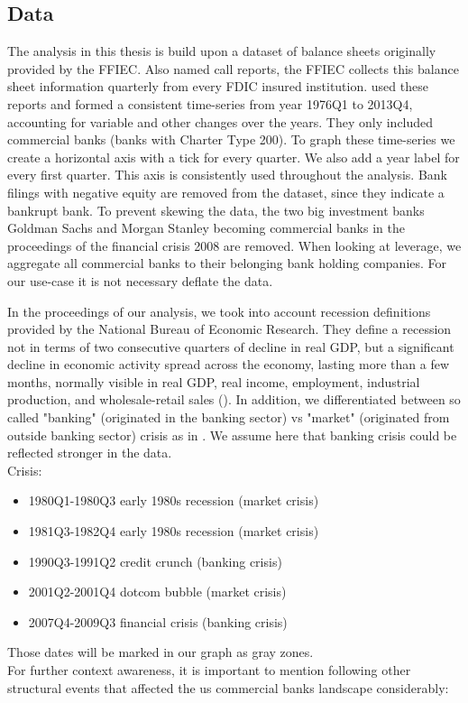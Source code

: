 \documentclass[12pt, a4paper]{article} %
\begin{document}
\subsection{Data}
\label{sec:data}

The analysis in this thesis is build upon a dataset of balance sheets originally provided by the FFIEC. Also named call reports, the FFIEC collects this balance sheet information quarterly from every FDIC insured institution. \citep{DrechslerSchnabel2017} used these reports and formed a consistent time-series from year 1976Q1 to 2013Q4, accounting for variable and other changes over the years. They only included commercial banks (banks with Charter Type 200).
To graph these time-series we create a horizontal axis with a tick for every quarter. We also add a year label for every first quarter. This axis is consistently used throughout the analysis. Bank filings with negative equity are removed from the dataset, since they indicate a bankrupt bank. To prevent skewing the data, the two big investment banks Goldman Sachs and Morgan Stanley becoming commercial banks in the proceedings of the financial crisis 2008 are removed. When looking at leverage, we aggregate all commercial banks to their belonging bank holding companies. For our use-case it is not necessary deflate the data.

In the proceedings of our analysis, we took into account recession definitions provided by the National Bureau of Economic Research. They define a recession not in terms of two consecutive quarters of decline in real GDP, but a significant decline in economic activity spread across the economy, lasting more than a few months, normally visible in real GDP, real income, employment, industrial production, and wholesale-retail sales (\cite{NBERBusinessCycles}). In addition, we differentiated between so called "banking" (originated in the banking sector) vs "market" (originated from outside banking sector) crisis as in \cite{BergerBouwman2013}. We assume here that banking crisis could be reflected stronger in the data.\\
Crisis:
\begin{itemize}
\item 1980Q1-1980Q3 early 1980s recession (market crisis)
\item 1981Q3-1982Q4 early 1980s recession (market crisis)
\item 1990Q3-1991Q2 credit crunch (banking crisis)
\item 2001Q2-2001Q4 dotcom bubble (market crisis)
\item 2007Q4-2009Q3 financial crisis (banking crisis)
\end{itemize}
Those dates will be marked in our graph as gray zones.\\
For further context awareness, it is important to mention following other structural events that affected the us commercial banks landscape considerably:
\end{document}
